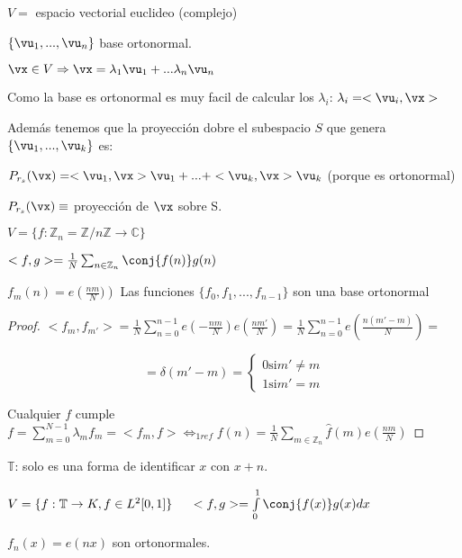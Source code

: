 $V =$ espacio vectorial euclideo (complejo)

$\{\vu_1, ..., \vu_n\}$ base ortonormal.

$\vx \in V \Rightarrow \vx = \lambda_1 \vu_1 + ... \lambda_n \vu_n$

Como la base es ortonormal es muy facil de calcular los $\lambda_i$: $\lambda_i = <\vu_i, \vx>$

Además tenemos que la proyección dobre el subespacio $S$ que genera $\{\vu_1,...,\vu_k\}$ es:

$ P_{r_s}(\vx) = <\vu_1, \vx>\vu_1 + ... + <\vu_k, \vx>\vu_k $ (porque es ortonormal)

$ P_{r_s}(\vx) \equiv $ proyección de $\vx$ sobre S.

$ V = \{f: \mathbb{Z}_n = \mathbb{Z}/n\mathbb{Z} \rightarrow \mathbb{C} \} $

$<f, g> = \frac{1}{N} \sum_{n \in \mathbb{Z}_n} \conj{f(n)} g(n)$


\begin{prop}
	$f_m(n) = e\left(\frac{nm}{N}) \right) $ Las funciones $\{ f_0, f_1, ..., f_{n-1}\}$ son una base ortonormal 

\end{prop}

\begin{proof}

	$<f_m, f_{m'}> = \frac{1}{N} \sum^{n-1}_{n = 0} e \left(-\frac{nm}{N} \right) e \left(\frac{nm'}{N} \right) = \frac{1}{N} \sum^{n-1}_{n = 0} e \left( \frac{n (m' - m)}{N} \right) =$

	$$ = \delta (m' - m) = \begin{cases}
		0 \mbox{si} m' \neq m \\
		1 \mbox{si} m' = m
	\end{cases}
	$$

	Cualquier $f$ cumple $f = \sum^{N - 1}_{m = 0} \lambda_m f_m = <f_m, f> \Leftrightarrow_{1 ref} f(n) = \frac{1}{N} \sum_{m \in \mathbb{Z}_n} \hat{f}(m) e(\frac{nm}{N}) $

\end{proof}

\begin{prop}

	$\mathbb{T}$: solo es una forma de identificar $x$ con $x+n$.

	$V = \{ f: \mathbb{T} \rightarrow K, f \in L^2 [0,1]\} \;\;\;\;\; <f,g> = \int\limits^{1}_0 \conj{f(x)} g(x) dx $

	$f_n(x) = e(nx)$ son ortonormales.

\end{prop}

